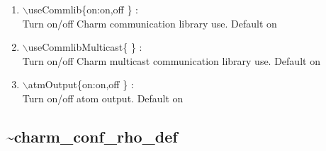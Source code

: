 \documentclass[12pt,titlepage]{article}
\begin{document}
\begin{enumerate}
  \vspace{0.15in} 
  \item  $\backslash$useCommlib\{on:on,off \} : \\
  Turn on/off Charm communication library use. Default on
  \vspace{0.15in} 
  \item  $\backslash$useCommlibMulticast\{ \} : \\   
  \vspace{0.15in} 
  Turn on/off Charm multicast communication library use. Default on
  \item  $\backslash$atmOutput\{on:on,off \} : \\   
  Turn on/off atom output. Default on
\end{enumerate}

\newpage
\subsection*{\bf \~{ }charm\_conf\_rho\_def}
\end{document}
